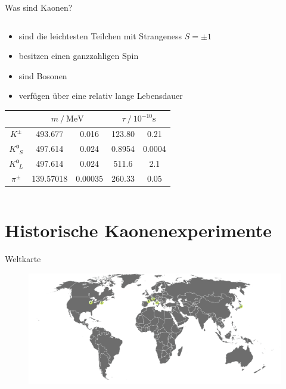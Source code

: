 \documentclass[aspectratio=1610, professionalfonts, 9pt, t]{beamer}
\begin{document}
\begin{frame}{Was sind Kaonen?}
\begin{columns}[onlytextwidth]
\begin{column}{0.5\textwidth}
\begin{itemize}
          \item sind die leichtesten Teilchen mit Strangeness $S = \pm1$
          \item besitzen einen ganzzahligen Spin
          \item sind Bosonen
          \item verfügen über eine relativ lange Lebensdauer
        \end{itemize}
        \begin{table}
          \centering
          \begin{tabular}{
              S[table-format=6.0]
              S[table-format=3.5]
              @{${}\pm{}$}
              S[table-format=1.5]
              S[table-format=3.4]
              @{${}\pm{}$}
              S[table-format=1.4]
            }
              \toprule
              &  &  \\
              \midrule
              $K^{\pm}$   & 493.677 & 0.016 & 123.80 & 0.21 \\
              $K⁰_{S}$    & 497.614 & 0.024 & 0.8954 & 0.0004 \\
              $K⁰_{L}$    & 497.614 & 0.024 & 511.6  & 2.1 \\
              ${\pi}^{\pm}$ & 139.57018 & 0.00035 & 260.33 & 0.05 \\
              \bottomrule
          \end{tabular}
        \end{table}
      \end{column}
    \end{columns}
  \end{frame}

\section{Historische Kaonenexperimente}
  \begin{frame}{Weltkarte}
    \begin{figure}[ht]
      \begin{center}
        \includegraphics[width=\textwidth]{Images/worldmap.png}
      \end{center}
    \end{figure}
  \end{frame}
\end{document}
